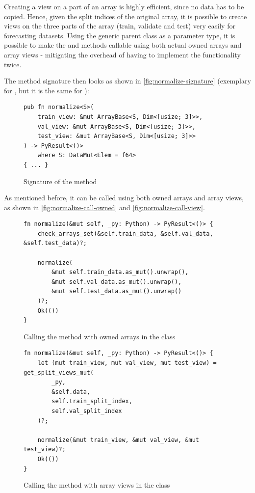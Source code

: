 \documentclass[review]{AIM_report}
\begin{document}
Creating a view on a part of an array is highly efficient, since no data has to be copied. Hence, given the split indices of the original array, it is possible to create views on the three parts of the array (train, validate and test) very easily for forecasting datasets. Using the generic parent class \arraybase as a parameter type, it is possible to make the \normalize and \standardize methods callable using both actual owned arrays and array views - mitigating the overhead of having to implement the functionality twice.

The method signature then looks as shown in \autoref{fig:normalize-signature} (exemplary for \normalize, but it is the same for \standardize):
\begin{figure}[H]
    \begin{lstlisting}[style=rust]
pub fn normalize<S>(
    train_view: &mut ArrayBase<S, Dim<[usize; 3]>>,
    val_view: &mut ArrayBase<S, Dim<[usize; 3]>>,
    test_view: &mut ArrayBase<S, Dim<[usize; 3]>>
) -> PyResult<()>
    where S: DataMut<Elem = f64>
{ ... }
    \end{lstlisting}
    \caption{Signature of the \normalize method}
    \label{fig:normalize-signature}
\end{figure}

As mentioned before, it can be called using both owned arrays and array views, as shown in \autoref{fig:normalize-call-owned} and \autoref{fig:normalize-call-view}.

\begin{figure}[H]
    \begin{lstlisting}[style=rust]
fn normalize(&mut self, _py: Python) -> PyResult<()> {
    check_arrays_set(&self.train_data, &self.val_data, &self.test_data)?;

    normalize(
        &mut self.train_data.as_mut().unwrap(),
        &mut self.val_data.as_mut().unwrap(),
        &mut self.test_data.as_mut().unwrap()
    )?;
    Ok(())
} 
    \end{lstlisting}
    \caption{Calling the \normalize method with owned arrays in the \classificationDataSet class}
    \label{fig:normalize-call-owned}
\end{figure}

\begin{figure}[H]
    \begin{lstlisting}[style=rust]
fn normalize(&mut self, _py: Python) -> PyResult<()> {
    let (mut train_view, mut val_view, mut test_view) = get_split_views_mut(
        _py,
        &self.data,
        self.train_split_index,
        self.val_split_index
    )?;

    normalize(&mut train_view, &mut val_view, &mut test_view)?;
    Ok(())
}
    \end{lstlisting}
    \caption{Calling the \normalize method with array views in the \forecastingDataSet class}
    \label{fig:normalize-call-view}
\end{figure}
\end{document}
